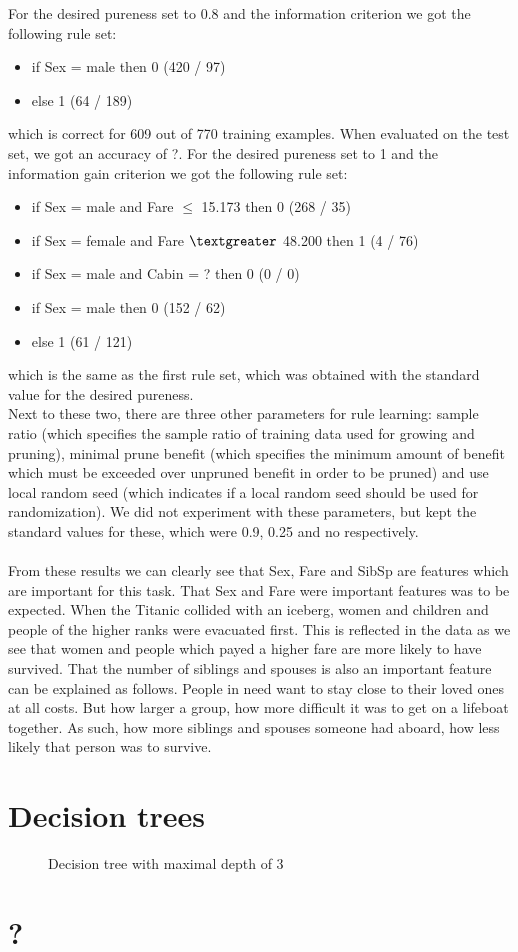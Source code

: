 \documentclass[12pt,a4paper]{article}
\begin{document}
For the desired pureness set to 0.8 and the information criterion we got the following rule set:
\begin{itemize}

\item if Sex = male then 0  (420 / 97)
\item else 1  (64 / 189)

\end{itemize}
which is correct for 609 out of 770 training examples.
When evaluated on the test set, we got an accuracy of ?.
For the desired pureness set to 1 and the information gain criterion we got the following rule set:
\begin{itemize}

\item if Sex = male and Fare $\leq$ 15.173 then 0  (268 / 35)
\item if Sex = female and Fare $\textgreater$ 48.200 then 1  (4 / 76)
\item if Sex = male and Cabin = ? then 0  (0 / 0)
\item if Sex = male then 0  (152 / 62)
\item else 1  (61 / 121)

\end{itemize}
which is the same as the first rule set, which was obtained with the standard value for the desired pureness.\\
Next to these two, there are three other parameters for rule learning: sample ratio (which specifies the sample ratio of training data used for growing and pruning), minimal prune benefit (which specifies the minimum amount of benefit which must be exceeded over unpruned benefit in order to be pruned) and use local random seed (which indicates if a local random seed should be used for randomization). We did not experiment with these parameters, but kept the standard values for these, which were 0.9, 0.25 and no respectively.\\
\\
From these results we can clearly see that Sex, Fare and SibSp are features which are important for this task. That Sex and Fare were important features was to be expected. When the Titanic collided with an iceberg, women and children and people of the higher ranks were evacuated first. This is reflected in the data as we see that women and people which payed a higher fare are more likely to have survived. That the number of siblings and spouses is also an important feature can be explained as follows. People in need want to stay close to their loved ones at all costs. But how larger a group, how more difficult it was to get on a lifeboat together. As such, how more siblings and spouses someone had aboard, how less likely that person was to survive.

\section{Decision trees}

\begin{figure}[htbp]
  \centering
  
  \caption{Decision tree with maximal depth of 3}
\end{figure}

\section{?}
\end{document}
